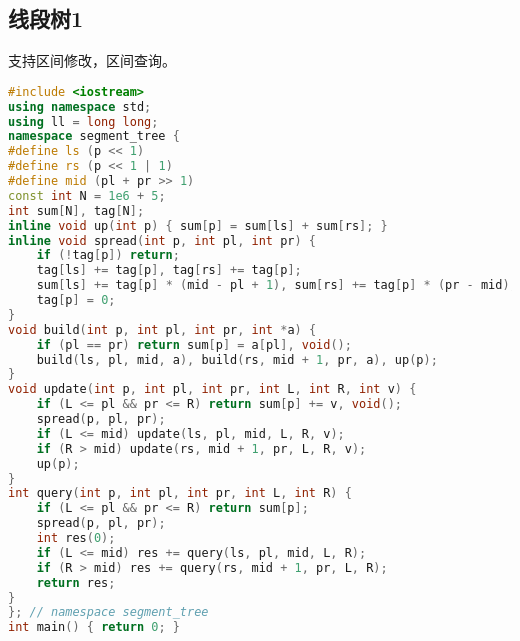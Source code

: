 \documentclass[9pt, a4paper, oneside]{book}
\begin{document}
\subsection{线段树1}
支持区间修改，区间查询。
\begin{lstlisting}[language={C++}]
#include <iostream>
using namespace std;
using ll = long long;
namespace segment_tree {
#define ls (p << 1)
#define rs (p << 1 | 1)
#define mid (pl + pr >> 1)
const int N = 1e6 + 5;
int sum[N], tag[N];
inline void up(int p) { sum[p] = sum[ls] + sum[rs]; }
inline void spread(int p, int pl, int pr) {
    if (!tag[p]) return;
    tag[ls] += tag[p], tag[rs] += tag[p];
    sum[ls] += tag[p] * (mid - pl + 1), sum[rs] += tag[p] * (pr - mid);
    tag[p] = 0;
}
void build(int p, int pl, int pr, int *a) {
    if (pl == pr) return sum[p] = a[pl], void();
    build(ls, pl, mid, a), build(rs, mid + 1, pr, a), up(p);
}
void update(int p, int pl, int pr, int L, int R, int v) {
    if (L <= pl && pr <= R) return sum[p] += v, void();
    spread(p, pl, pr);
    if (L <= mid) update(ls, pl, mid, L, R, v);
    if (R > mid) update(rs, mid + 1, pr, L, R, v);
    up(p);
}
int query(int p, int pl, int pr, int L, int R) {
    if (L <= pl && pr <= R) return sum[p];
    spread(p, pl, pr);
    int res(0);
    if (L <= mid) res += query(ls, pl, mid, L, R);
    if (R > mid) res += query(rs, mid + 1, pr, L, R);
    return res;
}
}; // namespace segment_tree
int main() { return 0; }\end{lstlisting}
\end{document}
